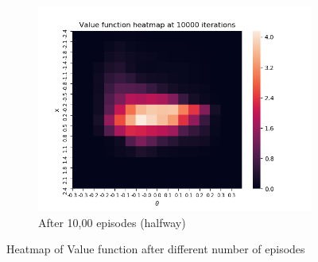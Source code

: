 \documentclass[a4paper]{article}
\begin{document}
\begin{figure}[h!]
    \begin{subfigure}[b]{0.5\textwidth}
        \centering
        \includegraphics[width=\textwidth]{heatmap_10000.png}
        \caption{After 10,00 episodes (halfway)}
    \end{subfigure}
    \caption{Heatmap of Value function after different number of episodes}
    \label{fig-heatmap-diff}
\end{figure}
\end{document}
